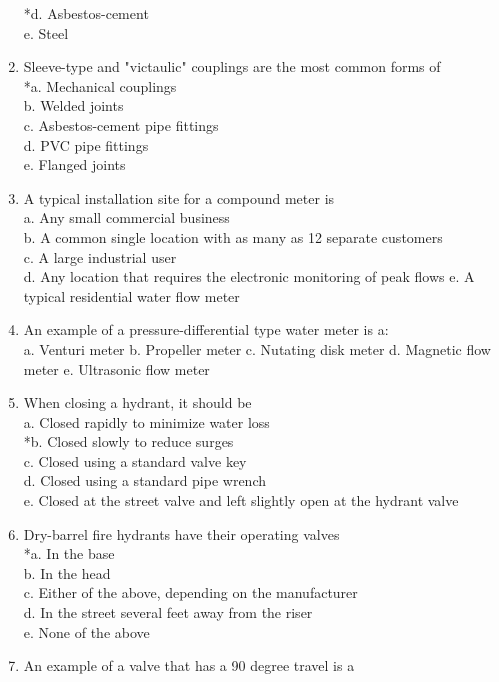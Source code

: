 \begin{enumerate}[1.]
*d. Asbestos-cement\\
e. Steel\\
\item Sleeve-type and "victaulic" couplings are the most common forms of\\
*a. Mechanical couplings\\
b. Welded joints\\
c. Asbestos-cement pipe fittings\\
d. PVC pipe fittings\\
e. Flanged joints\\
\item A typical installation site for a compound meter is\\
a. Any small commercial business\\
b. A common single location with as many as 12 separate customers\\
c. A large industrial user\\
d. Any location that requires the electronic monitoring of peak flows e. A typical residential water flow meter\\
\item An example of a pressure-differential type water meter is a:\\
a. Venturi meter b. Propeller meter c. Nutating disk meter d. Magnetic flow meter e. Ultrasonic flow meter\\
\item When closing a hydrant, it should be\\
a. Closed rapidly to minimize water loss\\
*b. Closed slowly to reduce surges\\
c. Closed using a standard valve key\\
d. Closed using a standard pipe wrench\\
e. Closed at the street valve and left slightly open at the hydrant valve\\
\item Dry-barrel fire hydrants have their operating valves\\
*a. In the base\\
b. In the head\\
c. Either of the above, depending on the manufacturer\\
d. In the street several feet away from the riser\\
e. None of the above\\
\item An example of a valve that has a 90 degree travel is a\\

\end{enumerate}
